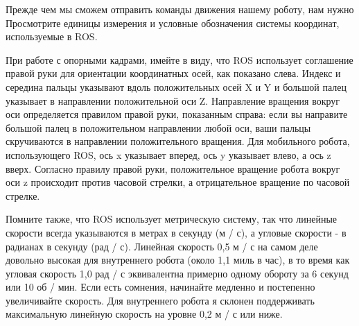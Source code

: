 

Прежде чем мы сможем отправить команды движения нашему роботу, нам нужно Просмотрите единицы измерения и условные обозначения системы координат, используемые в ROS. 

При работе с опорными кадрами, имейте в виду, что ROS использует соглашение правой руки для ориентации координатных осей, как показано слева. Индекс и середина пальцы указывают вдоль положительных осей X и Y и большой палец указывает в направлении положительной оси Z. Направление вращения вокруг оси определяется правилом правой руки, показанным справа: если вы направите большой палец в положительном направлении любой оси, ваши пальцы скручиваются в направлении положительного вращения. Для мобильного робота, использующего ROS, ось x указывает вперед, ось y указывает влево, а ось z вверх. Согласно правилу правой руки, положительное вращение робота вокруг оси z происходит против часовой стрелки, а отрицательное вращение по часовой стрелке. 

Помните также, что ROS использует метрическую систему, так что линейные скорости всегда указываются в метрах в секунду (м / с), а угловые скорости - в радианах в секунду (рад / с). Линейная скорость 0,5 м / с на самом деле довольно высокая для внутреннего робота (около 1,1 миль в час), в то время как угловая скорость 1,0 рад / с эквивалентна примерно одному обороту за 6 секунд или 10 об / мин. Если есть сомнения, начинайте медленно и постепенно увеличивайте скорость. Для внутреннего робота я склонен поддерживать максимальную линейную скорость на уровне 0,2 м / с или ниже.


